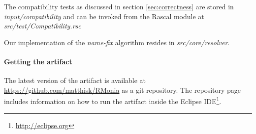 The compatibility tests as discussed in section \ref{sec:correctness} are stored in \textit{input/compatibility} and can be invoked from the Rascal module at \textit{src/test/Compatibility.rsc}

Our implementation of the \textit{name-fix}\citep{Erdweg2014a} algorithm resides in \textit{src/core/resolver}.

\paragraph{Getting the artifact}
The latest version of the artifact is available at \url{https://github.com/matthisk/RMonia} as a git repository. The repository page includes information on how to run the artifact inside the Eclipse IDE\footnote{\url{http://eclipse.org}}.
